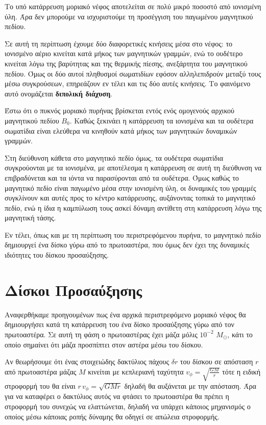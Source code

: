 \documentclass[a4paper,12pt]{memoir}
\newcommand{\sm}{$M_{\odot}$}
\begin{document}
Το υπό κατάρρευση μοριακό νέφος αποτελείται σε πολύ μικρό ποσοστό από ιονισμένη ύλη. Άρα δεν μπορούμε να ισχυριστούμε τη προσέγγιση του παγωμένου μαγνητικού πεδίου. 

Σε αυτή τη περίπτωση έχουμε δύο διαφορετικές κινήσεις μέσα στο νέφος: το ιονισμένο αέριο κινείται κατά μήκος των μαγνητικών γραμμών, ενώ το ουδέτερο κινείται λόγω της βαρύτητας και της θερμικής πίεσης, ανεξάρτητα του μαγνητικού πεδίου.
Όμως οι δύο αυτοί πληθυσμοί σωματιδίων εφόσον αλληλεπιδρούν μεταξύ τους μέσω συγκρούσεων, επηρεάζουν εν τέλει και τις δύο αυτές κινήσεις. Το φαινόμενο αυτό ονομάζεται \textbf{διπολική διάχυση}.

Έστω ότι ο πυκνός μοριακό πυρήνας βρίσκεται εντός ενός ομογενούς αρχικού μαγνητικού πεδίου $B_0$. Καθώς ξεκινάει η κατάρρευση τα ιονισμένα και τα ουδέτερα σωματίδια είναι ελεύθερα να κινηθούν κατά μήκος των μαγνητικών δυναμικών γραμμών. 

Στη διεύθυνση κάθετα στο μαγνητικό πεδίο όμως, τα ουδέτερα σωματίδια συγκρούονται με τα ιονισμένα, με αποτέλεσμα η κατάρρευση σε αυτή τη διεύθυνση να επιβραδύνεται και τα ιόντα να παρασύρονται από τα ουδέτερα. Όμως καθώς το μαγνητικό πεδίο είναι παγωμένο μέσα στην ιονισμένη ύλη, οι δυναμικές του γραμμές συγκλίνουν και αυτές προς το κέντρο κατάρρευσης, αυξάνοντας τοπικά το μαγνητικό πεδίο, ενώ η ίδια η καμπύλωση τους ασκεί δύναμη αντίθετη στη κατάρρευση λόγω της μαγνητική τάσης. 

Εν τέλει, όπως και με τη περίπτωση του περιστρεφόμενου πυρήνα, το μαγνητικό πεδίο δημιουργεί ένα δίσκο γύρω από το πρωτοαστέρα, που όμως δεν έχει της δυναμικές ιδιότητες του δίσκου προσαύξησης.


\section{Δίσκοι Προσαύξησης}
Αναφερθήκαμε προηγουμένων πως ένα αρχικά περιστρεφόμενο μοριακό νέφος θα δημιουργήσει κατά τη κατάρρευση του ένα δίσκο προσαύξησης γύρω από τον πρωτοαστέρα. Σε αυτή τη φάση ο πρωτοαστέρας έχει μάζα μόλις $10^{-2}$ \sm, κάτι το οποίο σημαίνει ότι μάζα προσπίπτει στον αστέρα μέσω του δίσκου.

Αν θεωρήσουμε ότι ένας στοιχειώδης δακτύλιος πάχους $\delta r$ του δίσκου σε απόσταση $r$ από πρωτοαστέρα μάζας $M$ κινείται με κεπλεριανή ταχύτητα $v_{\phi}=\sqrt{\frac{GM}{r}}$ τότε η ειδική στροφορμή του θα είναι $r \, v_{\phi}=\sqrt{GMr}$ δηλαδή θα αυξάνεται με την απόσταση. Άρα για να καταφέρει ο δακτύλιος αυτός να φτάσει το πρωτοαστέρα θα πρέπει η στροφορμή του συνεχώς να ελαττώνεται, δηλαδή να υπάρχει κάποιος μηχανισμός ο οποίος μέσω κάποιας ροπής δύναμης θα οδηγεί σε απώλεια στροφορμής.
\end{document}
